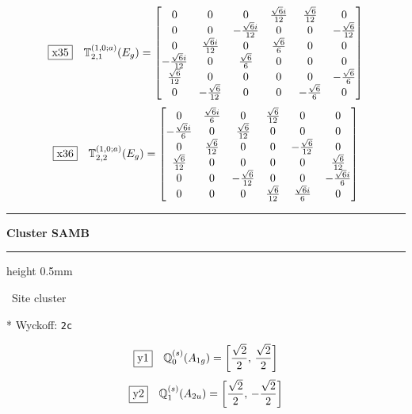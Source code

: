 \documentclass[fleqn,10pt,landscape]{jsarticle}
\begin{document}
\begin{dmath*}
\fbox{x35}\quad \mathbb{T}_{2,1}^{(1,0;a)}(E_{g})=\begin{bmatrix} 0 & 0 & 0 & \frac{\sqrt{6} i}{12} & \frac{\sqrt{6}}{12} & 0 \\ 0 & 0 & - \frac{\sqrt{6} i}{12} & 0 & 0 & - \frac{\sqrt{6}}{12} \\ 0 & \frac{\sqrt{6} i}{12} & 0 & \frac{\sqrt{6}}{6} & 0 & 0 \\ - \frac{\sqrt{6} i}{12} & 0 & \frac{\sqrt{6}}{6} & 0 & 0 & 0 \\ \frac{\sqrt{6}}{12} & 0 & 0 & 0 & 0 & - \frac{\sqrt{6}}{6} \\ 0 & - \frac{\sqrt{6}}{12} & 0 & 0 & - \frac{\sqrt{6}}{6} & 0 \end{bmatrix}
\end{dmath*}
\begin{dmath*}
\fbox{x36}\quad \mathbb{T}_{2,2}^{(1,0;a)}(E_{g})=\begin{bmatrix} 0 & \frac{\sqrt{6} i}{6} & 0 & \frac{\sqrt{6}}{12} & 0 & 0 \\ - \frac{\sqrt{6} i}{6} & 0 & \frac{\sqrt{6}}{12} & 0 & 0 & 0 \\ 0 & \frac{\sqrt{6}}{12} & 0 & 0 & - \frac{\sqrt{6}}{12} & 0 \\ \frac{\sqrt{6}}{12} & 0 & 0 & 0 & 0 & \frac{\sqrt{6}}{12} \\ 0 & 0 & - \frac{\sqrt{6}}{12} & 0 & 0 & - \frac{\sqrt{6} i}{6} \\ 0 & 0 & 0 & \frac{\sqrt{6}}{12} & \frac{\sqrt{6} i}{6} & 0 \end{bmatrix}
\end{dmath*}
\vspace{5mm}
\noindent \rule[0.5mm]{5mm}{0.5mm}\hspace{3mm}\textbf{Cluster SAMB}\hspace{3mm}\leaders\hrule height 0.5mm\hfill\kern0pt
\vspace{3mm}

\noindent\textbullet\, Site cluster

\vspace{5mm}

\noindent ** Wyckoff: \texttt{2c}

\begin{dmath*}
\fbox{y1}\quad \mathbb{Q}_{0}^{(s)}(A_{1g})=\left[ \frac{\sqrt{2}}{2},\, \frac{\sqrt{2}}{2} \right]
\end{dmath*}
\begin{dmath*}
\fbox{y2}\quad \mathbb{Q}_{1}^{(s)}(A_{2u})=\left[ \frac{\sqrt{2}}{2},\, - \frac{\sqrt{2}}{2} \right]
\end{dmath*}
\vspace{5mm}
\end{document}
